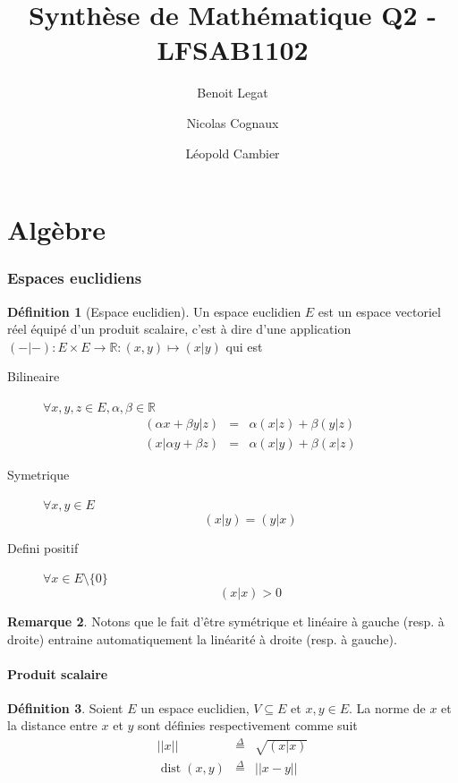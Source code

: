 \documentclass[11pt,a4paper]{article}
\title{Synthèse de Mathématique Q2 - LFSAB1102}
\author{Benoit Legat \and Nicolas Cognaux \and Léopold Cambier}
\theoremstyle{definition}
\newtheorem{mydef}{Définition}%
\newtheorem{myrem}[mydef]{Remarque}
\DeclareMathOperator{\dist}{dist}
\newcommand{\eqdef}{\stackrel{\Delta}{=}}
\newcommand{\R}{\mathbb{R}}
\begin{document}
\maketitle

\part{Algèbre}

\section{Espaces euclidiens}
\begin{mydef}[Espace euclidien]
	Un espace euclidien $E$ est un espace vectoriel réel équipé d'un produit scalaire, c'est à dire d'une application
	$(-|-) : E \times E \to \R : (x, y) \mapsto (x|y)$ qui est
	\begin{description}
			\item[Bilineaire]
			$\forall x, y, z \in E, \alpha, \beta \in \R$
			\begin{eqnarray*}
				(\alpha x + \beta y | z) & = & \alpha (x | z) + \beta (y | z)\\
				(x | \alpha y + \beta z) & = & \alpha (x | y) + \beta (x | z)
			\end{eqnarray*}
			\item[Symetrique]
			$\forall x,y \in E$
			$$(x|y) = (y|x)$$
			\item[Defini positif]
			$\forall x \in E \setminus \{0\}$
			$$(x|x) > 0$$
	\end{description}
\end{mydef}

\begin{myrem}
	Notons que le fait d'être symétrique et linéaire à gauche (resp. à droite) entraine automatiquement la linéarité à droite (resp. à gauche).
\end{myrem}

\subsection{Produit scalaire}

\begin{mydef}
	Soient $E$ un espace euclidien, $V \subseteq E$ et $x,y \in E$.
	La norme de $x$ et la distance entre $x$ et $y$ sont définies respectivement comme suit
	\begin{eqnarray*}
		||x|| & \eqdef & \sqrt{(x|x)}\\
		\dist(x, y) & \eqdef & ||x - y||\\
	\end{eqnarray*}
\end{mydef}
\end{document}
